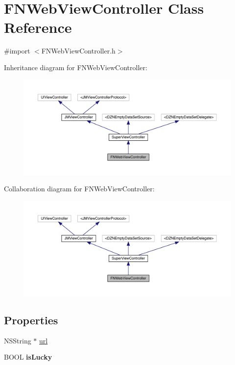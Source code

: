\hypertarget{interface_f_n_web_view_controller}{}\section{F\+N\+Web\+View\+Controller Class Reference}
\label{interface_f_n_web_view_controller}


{\ttfamily \#import $<$F\+N\+Web\+View\+Controller.\+h$>$}



Inheritance diagram for F\+N\+Web\+View\+Controller\+:\nopagebreak
\begin{figure}[H]
\begin{center}
\leavevmode
\includegraphics[width=350pt]{interface_f_n_web_view_controller__inherit__graph}
\end{center}
\end{figure}


Collaboration diagram for F\+N\+Web\+View\+Controller\+:\nopagebreak
\begin{figure}[H]
\begin{center}
\leavevmode
\includegraphics[width=350pt]{interface_f_n_web_view_controller__coll__graph}
\end{center}
\end{figure}
\subsection*{Properties}
\begin{DoxyCompactItemize}
\item 
N\+S\+String $\ast$ \mbox{\hyperlink{interface_f_n_web_view_controller_a4b40a192cf94637e4d50c3efde51042d}{url}}
\item 
\mbox{\label{interface_f_n_web_view_controller_a7a850442feae17bad8ad4cb192d14086}} 
B\+O\+OL {\bfseries is\+Lucky}
\end{DoxyCompactItemize}

